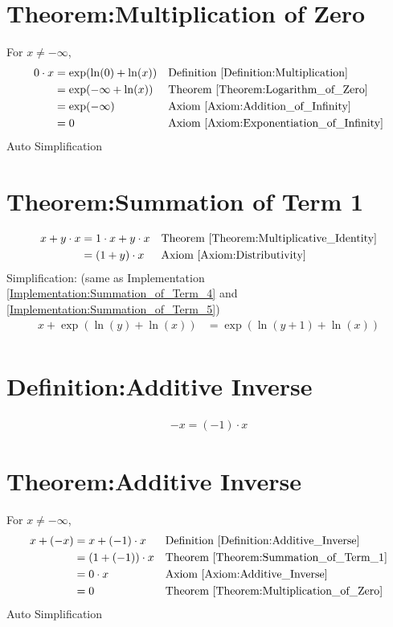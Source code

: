 \documentclass[12pt,a4paper]{report}
\begin{document}
\section{Theorem:Multiplication of Zero}
\label{Theorem:Multiplication_of_Zero}
For $x \neq -\infty$,
\begin{align*}
0 \cdot x
&= \exp(\ln(0) + \ln(x))
&& \text{Definition \ref{Definition:Multiplication}} \\
&= \exp(-\infty + \ln(x))
&& \text{Theorem \ref{Theorem:Logarithm_of_Zero}} \\
&= \exp(-\infty)
&& \text{Axiom \ref{Axiom:Addition_of_Infinity}} \\
&= 0
&& \text{Axiom \ref{Axiom:Exponentiation_of_Infinity}} \\
\end{align*}
Auto Simplification

\section{Theorem:Summation of Term 1}
\label{Theorem:Summation_of_Term_1}
\begin{align*}
x + y \cdot x
&= 1 \cdot x + y \cdot x
&& \text{Theorem \ref{Theorem:Multiplicative_Identity}} \\
&= (1+y) \cdot x
&& \text{Axiom \ref{Axiom:Distributivity}} \\
\end{align*}
Simplification: (same as Implementation \ref{Implementation:Summation_of_Term_4} and \ref{Implementation:Summation_of_Term_5})
\begin{align*}
x + \exp(\ln(y) + \ln(x)) &= \exp(\ln(y+1) + \ln(x)) \\
\end{align*}

\section{Definition:Additive Inverse}
\label{Definition:Additive_Inverse}
\begin{align*}
-x = (-1) \cdot x
\end{align*}

\section{Theorem:Additive Inverse}
\label{Theorem:Additive_Inverse}
For $x \neq -\infty$,
\begin{align*}
x + (-x)
&= x + (-1) \cdot x
&& \text{Definition \ref{Definition:Additive_Inverse}} \\
&= (1 + (-1)) \cdot x
&& \text{Theorem \ref{Theorem:Summation_of_Term_1}} \\
&= 0 \cdot x
&& \text{Axiom \ref{Axiom:Additive_Inverse}} \\
&= 0
&& \text{Theorem \ref{Theorem:Multiplication_of_Zero}} \\
\end{align*}
Auto Simplification
\end{document}
